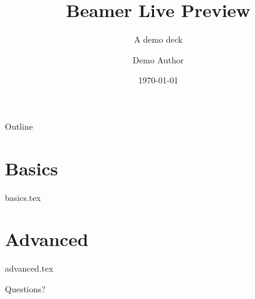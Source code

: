 \documentclass[11pt,aspectratio=169,dvipsnames,svgnames]{beamer}
\title{Beamer Live Preview}
\subtitle{A demo deck}
\date{\today}
\author{Demo Author}
\institute{Department of Examples\\University of Somewhere}
\begin{document}
\maketitle

\begin{frame}{Outline}
  \tableofcontents
\end{frame}

\section{Basics}
{basics.tex}

\section{Advanced}
{advanced.tex}

\begin{frame}[standout]
  Questions?
\end{frame}
\end{document}
